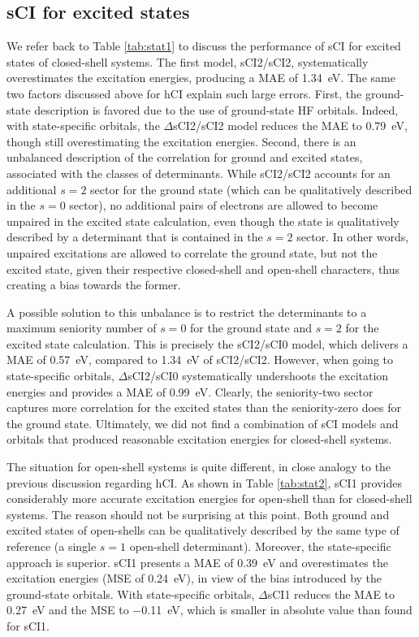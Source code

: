 \documentclass[aip,jcp,reprint,noshowkeys,superscriptaddress]{revtex4-1}
\begin{document}
\subsection{sCI for excited states}
\label{sec:res_D}

We refer back to Table \ref{tab:stat1} to discuss the performance of sCI for excited states of closed-shell systems.
The first model, sCI2/sCI2, systematically overestimates the excitation energies, producing a MAE of \SI{1.34}{\eV}.
The same two factors discussed above for hCI explain such large errors.
First, the ground-state description is favored due to the use of ground-state HF orbitals.
Indeed, with state-specific orbitals, the $\Delta$sCI2/sCI2 model reduces the MAE to \SI{0.79}{\eV}, though still overestimating the excitation energies.
Second, there is an unbalanced description of the correlation for ground and excited states, associated with the classes of determinants.
While sCI2/sCI2 accounts for an additional $s=2$ sector for the ground state (which can be qualitatively described in the $s=0$ sector),
no additional pairs of electrons are allowed to become unpaired in the excited state calculation, even though the state is qualitatively described by a determinant that is contained in the $s=2$ sector.
In other words, unpaired excitations are allowed to correlate the ground state, but not the excited state, given their respective closed-shell and open-shell characters,
thus creating a bias towards the former.

A possible solution to this unbalance is to restrict the determinants to a maximum seniority number of $s=0$ for the ground state and $s=2$ for the excited state calculation.
This is precisely the sCI2/sCI0 model, which delivers a MAE of \SI{0.57}{\eV}, compared to \SI{1.34}{\eV} of sCI2/sCI2.
However, when going to state-specific orbitals, $\Delta$sCI2/sCI0 systematically undershoots the excitation energies and provides a MAE of \SI{0.99}{\eV}.
Clearly, the seniority-two sector captures more correlation for the excited states than the seniority-zero does for the ground state.
Ultimately, we did not find a combination of sCI models and orbitals that produced reasonable excitation energies for closed-shell systems.

The situation for open-shell systems is quite different, in close analogy to the previous discussion regarding hCI.
As shown in Table \ref{tab:stat2}, sCI1 provides considerably more accurate excitation energies for open-shell than for closed-shell systems.
The reason should not be surprising at this point.
Both ground and excited states of open-shells can be qualitatively described by the same type of reference (a single $s=1$ open-shell determinant).
Moreover, the state-specific approach is superior.
sCI1 presents a MAE of \SI{0.39}{\eV} and overestimates the excitation energies (MSE of \SI{+0.24}{\eV}), in view of the bias introduced by the ground-state orbitals.
With state-specific orbitals, $\Delta$sCI1 reduces the MAE to \SI{0.27}{\eV} and the MSE to \SI{-0.11}{\eV}, which is smaller in absolute value than found for sCI1.
\end{document}
